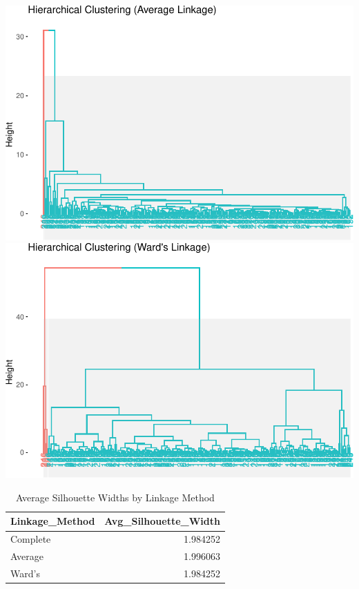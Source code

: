 \documentclass[
]{article}
\begin{document}
\includegraphics{Final-Report_files/figure-latex/hierarchical comaprison of linkage methods-1.pdf}
\includegraphics{Final-Report_files/figure-latex/hierarchical comaprison of linkage methods-2.pdf}

\begingroup\fontsize{8.5}{10.5}\selectfont

\begin{longtable}[t]{lr}
\caption{\label{tab:average silhouette width}Average Silhouette Widths by Linkage Method}\\
\toprule
Linkage\_Method & Avg\_Silhouette\_Width\\
\midrule
Complete & 1.984252\\
Average & 1.996063\\
Ward's & 1.984252\\
\bottomrule
\end{longtable}
\endgroup{}
\end{document}
